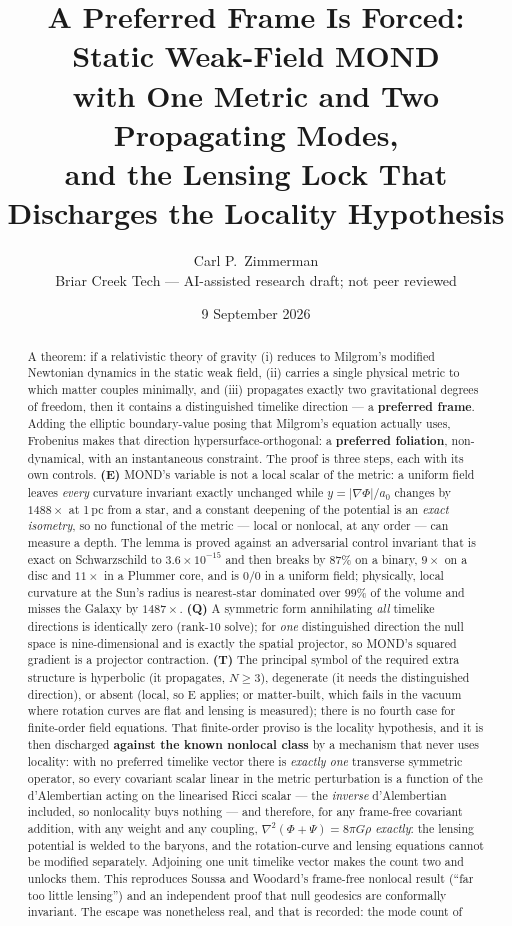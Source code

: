 \documentclass[11pt,letterpaper]{article}
\title{A Preferred Frame Is Forced: Static Weak-Field MOND\\ with One Metric and Two Propagating Modes,\\ and the Lensing Lock That Discharges the Locality Hypothesis}
\author{Carl P.\ Zimmerman\\ \small Briar Creek Tech --- AI-assisted research draft; not peer reviewed}
\date{9 September 2026}
\begin{document}
\maketitle

\begin{abstract}
A theorem: if a relativistic theory of gravity (i) reduces to Milgrom's modified Newtonian dynamics in the static weak field, (ii) carries a single physical metric to which matter couples minimally, and (iii) propagates exactly two gravitational degrees of freedom, then it contains a distinguished timelike direction --- a \textbf{preferred frame}. Adding the elliptic boundary-value posing that Milgrom's equation actually uses, Frobenius makes that direction hypersurface-orthogonal: a \textbf{preferred foliation}, non-dynamical, with an instantaneous constraint. The proof is three steps, each with its own controls. \textbf{(E)} MOND's variable is not a local scalar of the metric: a uniform field leaves \emph{every} curvature invariant exactly unchanged while $y=|\nabla\Phi|/a_0$ changes by $1488\times$ at 1\,pc from a star, and a constant deepening of the potential is an \emph{exact isometry}, so no functional of the metric --- local or nonlocal, at any order --- can measure a depth. The lemma is proved against an adversarial control invariant that is exact on Schwarzschild to $3.6\times10^{-15}$ and then breaks by $87\%$ on a binary, $9\times$ on a disc and $11\times$ in a Plummer core, and is $0/0$ in a uniform field; physically, local curvature at the Sun's radius is nearest-star dominated over $99\%$ of the volume and misses the Galaxy by $1487\times$. \textbf{(Q)} A symmetric form annihilating \emph{all} timelike directions is identically zero (rank-10 solve); for \emph{one} distinguished direction the null space is nine-dimensional and is exactly the spatial projector, so MOND's squared gradient is a projector contraction. \textbf{(T)} The principal symbol of the required extra structure is hyperbolic (it propagates, $N\ge3$), degenerate (it needs the distinguished direction), or absent (local, so E applies; or matter-built, which fails in the vacuum where rotation curves are flat and lensing is measured); there is no fourth case for finite-order field equations. That finite-order proviso is the locality hypothesis, and it is then discharged \textbf{against the known nonlocal class} by a mechanism that never uses locality: with no preferred timelike vector there is \emph{exactly one} transverse symmetric operator, so every covariant scalar linear in the metric perturbation is a function of the d'Alembertian acting on the linearised Ricci scalar --- the \emph{inverse} d'Alembertian included, so nonlocality buys nothing --- and therefore, for any frame-free covariant addition, with any weight and any coupling, $\nabla^2(\Phi+\Psi)=8\pi G\rho$ \emph{exactly}: the lensing potential is welded to the baryons, and the rotation-curve and lensing equations cannot be modified separately. Adjoining one unit timelike vector makes the count two and unlocks them. This reproduces Soussa and Woodard's frame-free nonlocal result (``far too little lensing'') and an independent proof that null geodesics are conformally invariant. The escape was nonetheless real, and that is recorded: the mode count of 
\end{abstract}
\end{document}
